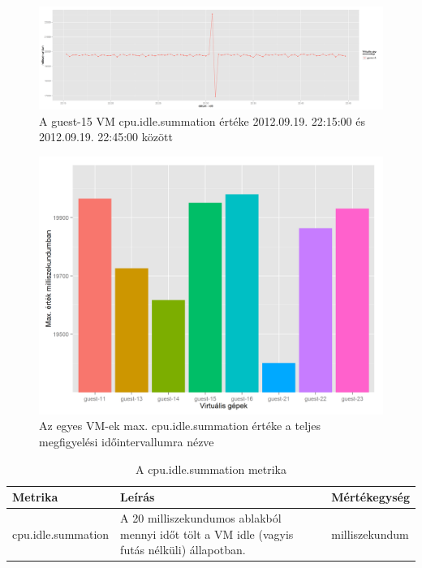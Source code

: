 \documentclass[a4paper,10pt,titlepage]{article}
\begin{document}
\begin{figure}[h!]
\centering
\includegraphics[width=1.00\textwidth]{figures/cpu_idle_summation-guest-15-20120919221500-20120919224500.png}
\caption{A guest-15 VM cpu.idle.summation értéke 2012.09.19. 22:15:00 és 2012.09.19. 22:45:00 között \label{fig:cpu_idle_summation_g15_2}}
\end{figure}

\begin{figure}[h!]
\centering
\includegraphics[width=1.00\textwidth]{figures/cpu_idle_summation-max-barchart.png}
\caption{Az egyes VM-ek max. cpu.idle.summation értéke a teljes megfigyelési időintervallumra nézve \label{fig:cpu_idle_summation_max_barchart}}
\end{figure}

\begin{table}[h]
	\caption{A cpu.idle.summation metrika}
	\centering
	\small
	\begin{tabular}{| p{3.5cm} | p{7.5cm} | p{2cm} |}
		\hline
		\rowcolor{tc_bone} \textbf{Metrika} & \textbf{Leírás} & \textbf{Mértékegység} \\
		\hline
		cpu.idle.summation & A 20 milliszekundumos ablakból mennyi időt tölt a VM idle (vagyis futás nélküli) állapotban. & milliszekundum \\ 
		\hline
	\end{tabular}
	\normalsize
	\label{tab:cpu.idle.summation}
\end{table}
\end{document}
